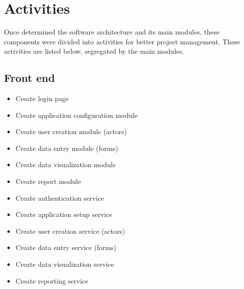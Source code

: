 \section{Activities}{} %

Once determined the software architecture and its main modules, these components were divided into activities for better project management. These activities are listed below, segregated by the main modules.

\subsection{Front end}\label{sec:FrontendActivities}
\begin{itemize}
\item Create login page
\item Create application configuration module
\item Create user creation module (actors)
\item Create data entry module (forms)
\item Create data visualization module
\item Create report module
\item Create authentication service
\item Create application setup service
\item Create user creation service (actors)
\item Create data entry service (forms)
\item Create data visualization service
\item Create reporting service
\end{itemize}

